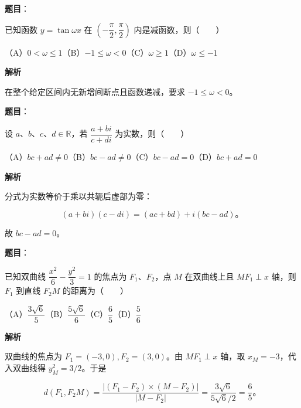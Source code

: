 \begin{answer}

\textbf{题目}：

已知函数 $y=\tan\omega x$ 在 $\left(-\dfrac{\pi}{2},\dfrac{\pi}{2}\right)$ 内是减函数，则\mbox{（　　）}

（A）$0<\omega\leqslant1$\quad（B）$-1\leqslant\omega<0$\quad（C）$\omega\geqslant1$\quad（D）$\omega\leqslant-1$

\textbf{解析}

在整个给定区间内无新增间断点且函数递减，要求 $-1\leqslant\omega<0$。


\end{answer}
\begin{answer}

\textbf{题目}：

设 $a\text{、}b\text{、}c\text{、}d\in\mathbb R$，若 $\dfrac{a+bi}{c+di}$ 为实数，则\mbox{（　　）}

（A）$bc+ad\ne0$\quad（B）$bc-ad\ne0$\quad（C）$bc-ad=0$\quad（D）$bc+ad=0$

\textbf{解析}

分式为实数等价于乘以共轭后虚部为零：

\nopagebreak[4]
\[
(a+bi)(c-di)=(ac+bd)+i(bc-ad)\text{。}
\]

故 $bc-ad=0$。


\end{answer}
\begin{answer}

\textbf{题目}：

已知双曲线 $\dfrac{x^2}{6}-\dfrac{y^2}{3}=1$ 的焦点为 $F_1\text{、}F_2$，点 $M$ 在双曲线上且 $MF_1\perp x$ 轴，则 $F_1$ 到直线 $F_2M$ 的距离为\mbox{（　　）}

（A）$\dfrac{3\sqrt6}{5}$\quad（B）$\dfrac{5\sqrt6}{6}$\quad（C）$\dfrac65$\quad（D）$\dfrac56$

\textbf{解析}

双曲线的焦点为 $F_1=(-3,0),F_2=(3,0)$。由 $MF_1\perp x$ 轴，取 $x_M=-3$，代入双曲线得 $y_M^2=3/2$。于是

\nopagebreak[4]
\[
d(F_1,F_2M)
=\frac{|(F_1-F_2)\times(M-F_2)|}{|M-F_2|}
=\frac{3\sqrt6}{5\sqrt6/2}
=\frac65\text{。}
\]


\end{answer}
